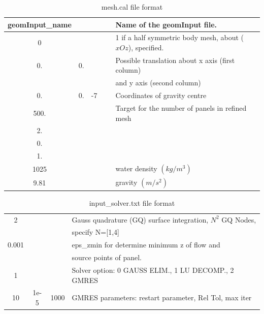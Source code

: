 \documentclass[12pt,a4paper,titlepage]{article}
\begin{document}
\begin{table}[ht]
\begin{center}
\caption{mesh.cal file format}\label{tab:meshcal}
\begin{tabular}{ccccl}
\hline
geomInput\_name &\ &\ &\ & Name of the geomInput file.\\
\hline
0 &\ &\ &\ & 1 if a half symmetric body mesh, about ($xOz$), specified.\\
\hline
0. &0. &\ &\ & Possible translation about x axis (first column)\\
\    &\      &\     &\ & and y axis (second column)\\
\hline
0. &0. &-7 &\ & Coordinates of gravity centre \\
\hline
500. &\ &\ &\ & Target for the number of panels in refined mesh \\
\hline
2. &\ &\ &\ &  \\
\hline
0. &\ &\ &\ &  \\
\hline
1. &\ &\ &\ &  \\
\hline
1025 &\ &\ &\ & water density $(kg/m^3)$\\
\hline
9.81 &\ &\ &\ &gravity $(m/s^2)$\\
\hline
\end{tabular}
\end{center}
\end{table}

\begin{table}[ht]
\begin{center}
\caption{input\_solver.txt file format}\label{tab:input_solver}
\begin{tabular}{cccl}
\hline
2&\ &\ & Gauss quadrature (GQ) surface integration, $N^2$ GQ Nodes,\\
\ &\ &\ &  specify N=[1,4] \\
\hline
0.001 &\ &\ &  eps\_zmin for determine minimum z of flow and \\
\ &\ &\ & source points of panel.\\
\hline
1 &\ &\  & Solver option: 0 GAUSS ELIM., 1 LU DECOMP., 2 GMRES \\
\hline
10 & 1e-5& 1000 & GMRES parameters: restart parameter, Rel Tol, max iter\\
\hline
\end{tabular}
\end{center}
\end{table}
\end{document}
